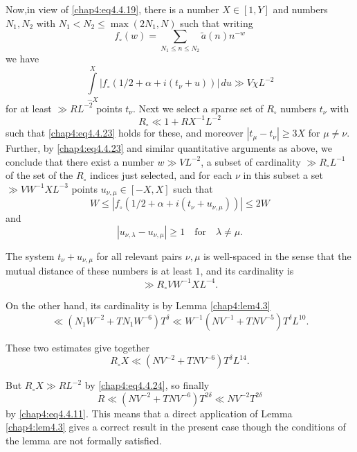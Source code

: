 Now,\pageoriginale in view of \eqref{chap4:eq4.4.19}, there is a
number $X\in [1,Y]$ and numbers $N_1,N_2$ with $N_1<N_2\leq
\max(2N_1,N)$ such that writing 
$$
f_\circ(w)=\sum\limits_{N_1\leq n\leq N_2}\tilde{a}(n)n^{-w}
$$
we have 
\begin{equation}\label{chap4:eq4.4.23}
\int\limits_{-X}^X\left|f_\circ\left(1/2+\alpha+i\left(t_\nu+u\right) \right)\right|\,du\gg V\chi L^{-2}
\end{equation}
for at least $\gg RL^{-2}$ points $t_\nu$. Next we select a sparse set of $R_\circ$ numbers $t_\nu$ with 
\begin{equation}\label{chap4:eq4.4.24}
R_\circ\ll 1+R X^{-1}L^{-2}
\end{equation}
such that \eqref{chap4:eq4.4.23} holds for these, and moreover
$|t_\mu-t_\nu|\geq 3 X$ for $\mu\neq\nu$. Further, by
\eqref{chap4:eq4.4.23} and similar quantitative arguments as above, we
conclude that there exist a number $w\gg VL^{-2}$, a subset of
cardinality $\gg R_\circ L^{-1}$ of the set of the $R_\circ$ indices
just selected, and for each $\nu$ in this subset a set $\gg
VW^{-1}X L^{-3}$ points $u_{\nu,\mu}\in[-X, X]$ such that  
\begin{equation}\label{chap4:eq4.4.25}
W\leq\left|f_\circ
\left(1/2+\alpha+i\left(t_\nu+u_{\nu,\mu}\right)\right) \right|\leq 2W 
\end{equation}
and
$$
\left|u_{\nu,\lambda}-u_{\nu,\mu}\right|\geq
1\quad\text{for}\quad\lambda\neq\mu. 
$$

The system $t_\nu+u_{\nu,\mu}$ for all relevant pairs $\nu,\mu$ is
well-spaced in the sense that the mutual distance of these numbers is
at least $1$, and its cardinality is  
$$
\gg R_\circ VW^{-1}X L^{-4}.
$$

On the other hand, its cardinality is by Lemma \ref{chap4:lem4.3} 
$$
\ll \left(N_1W^{-2}+TN_1W^{-6}\right)T^\delta\ll W^{-1}\left(NV^{-1}+TNV^{-5} \right)T^\delta L^{10}.
$$\pageoriginale

These two estimates give together
$$
R_\circ X\ll\left(NV^{-2}+TNV^{-6}\right)T^\delta L^{14}.
$$

But $R_\circ X\gg RL^{-2}$ by \eqref{chap4:eq4.4.24}, so finally
\begin{equation}\label{chap4:eq4.4.26}
R\ll\left(NV^{-2}+TNV^{-6}\right)T^{2\delta}\ll NV^{-2}T^{2\delta}
\end{equation}
by \eqref{chap4:eq4.4.11}. This means that a direct application of Lemma \ref{chap4:lem4.3} gives a correct result in the present case though the conditions of the lemma are not formally satisfied.

